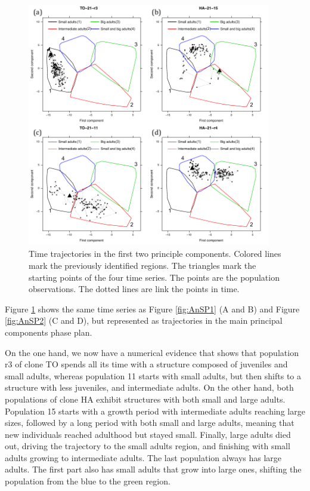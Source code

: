 \begin{figure}[!ht]
\begin{center}
\includegraphics[width=0.95\textwidth]{3-1_ChapExp1/Fig/AnnSP6}
\caption[Time trajectories in the first two principle components]{Time trajectories in the first two principle components.
Colored lines mark the previously identified regions. The triangles mark the
starting points of the four time series. The points are the population
observations. The dotted lines are link the points in time.}
\label{fig:AnSP6}
\end{center}
\end{figure}

Figure \ref{fig:AnSP6} shows the same time series as Figure \ref{fig:AnSP1} (A
and B) and Figure \ref{fig:AnSP2} (C and D), but represented as trajectories in
the main principal components phase plan.

On the one hand, we now have a numerical evidence that shows that population r3
of clone TO spends all its time with a structure composed of juveniles and small
adults, whereas population 11 starts with small adults, but then shifts to a
structure with less juveniles, and intermediate adults. On the other hand, both
populations of clone HA exhibit structures with both small and large adults.
Population 15 starts with a growth period with intermediate adults reaching
large sizes, followed by a long period with both small and large adults, meaning
that new individuals reached adulthood but stayed small. Finally, large adults
died out, driving the trajectory to the small adults region, and finishing with
small adults growing to intermediate adults. The last population always has
large adults. The first part also has small adults that grow into large ones,
shifting the population from the blue to the green region.

